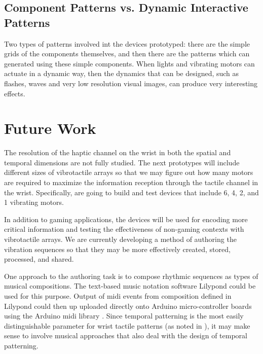 \documentclass{chi-ext}
\begin{document}
\subsection{Component Patterns vs. Dynamic Interactive Patterns}
Two types of patterns involved int the devices prototyped: there are the simple grids of the components themselves, and then there are the patterns which can generated using these simple components. When lights and vibrating motors can actuate in a dynamic way, then the dynamics that can be designed, such as flashes, waves and very low resolution visual images, can produce very interesting effects. 


\section{Future Work}
The resolution of the haptic channel on the wrist in both the spatial and temporal dimensions are not fully studied. The next prototypes will include different sizes of vibrotactile arrays so that we may figure out how many motors are required to maximize the information reception through the tactile channel in the wrist. Specifically, are going to build and test devices that include 6, 4, 2, and 1 vibrating motors. 

In addition to gaming applications, the devices will be used for encoding more critical information and testing the effectiveness of non-gaming contexts with vibrotactile arrays. We are currently developing a method of authoring the vibration sequences so that they may be more effectively created, stored, processed, and shared. 

One approach to the authoring task is to compose rhythmic sequences as types of musical compositions. The text-based music notation software Lilypond \cite{nienhuys2003lilypond} could be used for this purpose. Output of midi events from composition defined in Lilypond could then up uploaded directly onto Arduino micro-controller boards using the Arduino midi library \cite{best2014arduinoMidi}. Since temporal patterning is the most easily distinguishable parameter for wrist tactile patterns (as noted in \cite{lee2010buzzwear}), it may make sense to involve musical approaches that also deal with the design of temporal patterning.
\end{document}
